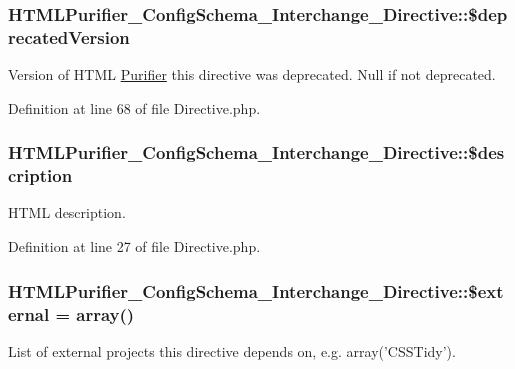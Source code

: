 \hypertarget{classHTMLPurifier__ConfigSchema__Interchange__Directive_a663449eb7012bf8977efac0fcf681861}{
\subsubsection[{\$deprecated\+Version}]{\setlength{\rightskip}{0pt plus 5cm}H\+T\+M\+L\+Purifier\+\_\+\+Config\+Schema\+\_\+\+Interchange\+\_\+\+Directive\+::\$deprecated\+Version}}\label{classHTMLPurifier__ConfigSchema__Interchange__Directive_a663449eb7012bf8977efac0fcf681861}
Version of H\+T\+M\+L \hyperlink{classPurifier}{Purifier} this directive was deprecated. Null if not deprecated. 

Definition at line 68 of file Directive.\+php.

\hypertarget{classHTMLPurifier__ConfigSchema__Interchange__Directive_a5d3ce181f3e8b87fd14383a303998031}{
\subsubsection[{\$description}]{\setlength{\rightskip}{0pt plus 5cm}H\+T\+M\+L\+Purifier\+\_\+\+Config\+Schema\+\_\+\+Interchange\+\_\+\+Directive\+::\$description}}\label{classHTMLPurifier__ConfigSchema__Interchange__Directive_a5d3ce181f3e8b87fd14383a303998031}
H\+T\+M\+L description. 

Definition at line 27 of file Directive.\+php.

\hypertarget{classHTMLPurifier__ConfigSchema__Interchange__Directive_a36350af665d522b6a0b25bedc477d79a}{
\subsubsection[{\$external}]{\setlength{\rightskip}{0pt plus 5cm}H\+T\+M\+L\+Purifier\+\_\+\+Config\+Schema\+\_\+\+Interchange\+\_\+\+Directive\+::\$external = array()}}\label{classHTMLPurifier__ConfigSchema__Interchange__Directive_a36350af665d522b6a0b25bedc477d79a}
List of external projects this directive depends on, e.\+g. array('C\+S\+S\+Tidy'). 

